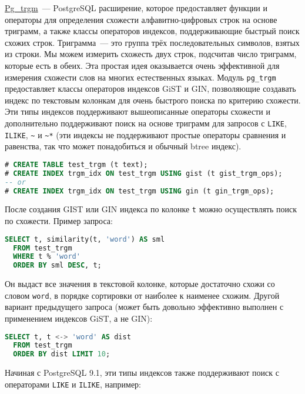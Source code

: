 \href{https://www.postgresql.org/docs/current/static/pgtrgm.html}{Pg\_trgm}~--- PostgreSQL расширение, которое предоставляет функции и операторы для определения схожести алфавитно-цифровых строк на основе триграмм, а также классы операторов индексов, поддерживающие быстрый поиск схожих строк. Триграмма~--- это группа трёх последовательных символов, взятых из строки. Мы можем измерить схожесть двух строк, подсчитав число триграмм, которые есть в обеих. Эта простая идея оказывается очень эффективной для измерения схожести слов на многих естественных языках. Модуль \lstinline!pg_trgm! предоставляет классы операторов индексов GiST и GIN, позволяющие создавать индекс по текстовым колонкам для очень быстрого поиска по критерию схожести. Эти типы индексов поддерживают вышеописанные операторы схожести и дополнительно поддерживают поиск на основе триграмм для запросов с \lstinline!LIKE!, \lstinline!ILIKE!, \lstinline!~! и \lstinline!~*! (эти индексы не поддерживают простые операторы сравнения и равенства, так что может понадобиться и обычный btree индекс).

\begin{lstlisting}[language=SQL,label=lst:pgtrgm2,caption=pg\_trgm]
# CREATE TABLE test_trgm (t text);
# CREATE INDEX trgm_idx ON test_trgm USING gist (t gist_trgm_ops);
-- or
# CREATE INDEX trgm_idx ON test_trgm USING gin (t gin_trgm_ops);
\end{lstlisting}

После создания GIST или GIN индекса по колонке \lstinline!t! можно осуществлять поиск по схожести. Пример запроса:

\begin{lstlisting}[language=SQL,label=lst:pgtrgm3,caption=pg\_trgm]
SELECT t, similarity(t, 'word') AS sml
  FROM test_trgm
  WHERE t % 'word'
  ORDER BY sml DESC, t;
\end{lstlisting}

Он выдаст все значения в текстовой колонке, которые достаточно схожи со словом \lstinline!word!, в порядке сортировки от наиболее к наименее схожим. Другой вариант предыдущего запроса (может быть довольно эффективно выполнен с применением индексов GiST, а не GIN):

\begin{lstlisting}[language=SQL,label=lst:pgtrgm4,caption=pg\_trgm]
SELECT t, t <-> 'word' AS dist
  FROM test_trgm
  ORDER BY dist LIMIT 10;
\end{lstlisting}

Начиная с PostgreSQL 9.1, эти типы индексов также поддерживают поиск с операторами \lstinline!LIKE! и \lstinline!ILIKE!, например:

